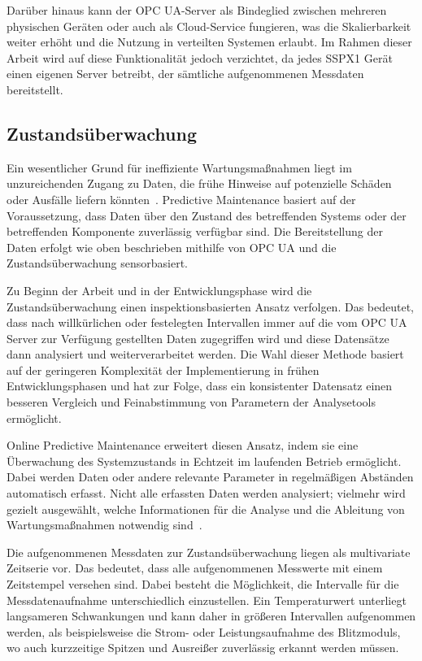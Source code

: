 Darüber hinaus kann der OPC UA-Server als Bindeglied zwischen mehreren physischen Geräten oder auch als Cloud-Service fungieren,
was die Skalierbarkeit weiter erhöht und die Nutzung in verteilten Systemen erlaubt. Im Rahmen dieser Arbeit wird auf diese Funktionalität
jedoch verzichtet, da jedes SSPX1 Gerät einen eigenen Server betreibt, der sämtliche aufgenommenen Messdaten bereitstellt.

\subsection{Zustandsüberwachung}\label{sec:zustandsueberwachung}
Ein wesentlicher Grund für ineffiziente Wartungsmaßnahmen liegt im unzureichenden Zugang zu Daten, die frühe Hinweise auf
potenzielle Schäden oder Ausfälle liefern könnten~\cite[S.~2]{Mobley2002}. Predictive Maintenance basiert auf der Voraussetzung, dass
Daten über den Zustand des betreffenden Systems oder der betreffenden Komponente zuverlässig verfügbar sind. Die Bereitstellung der
Daten erfolgt wie oben beschrieben mithilfe von OPC UA und die Zustandsüberwachung sensorbasiert.

Zu Beginn der Arbeit und in der Entwicklungsphase wird die Zustandsüberwachung einen inspektionsbasierten Ansatz verfolgen. Das
bedeutet, dass nach willkürlichen oder festelegten Intervallen immer auf die vom OPC UA Server zur Verfügung gestellten Daten
zugegriffen wird und diese Datensätze dann analysiert und weiterverarbeitet werden. Die Wahl dieser Methode basiert auf der
geringeren Komplexität der Implementierung in frühen Entwicklungsphasen und hat zur Folge, dass ein konsistenter Datensatz einen
besseren Vergleich und Feinabstimmung von Parametern der Analysetools ermöglicht.

Online Predictive Maintenance erweitert diesen Ansatz, indem sie eine Überwachung des Systemzustands in Echtzeit im laufenden Betrieb
ermöglicht. Dabei werden Daten oder andere relevante Parameter in regelmäßigen Abständen automatisch erfasst. Nicht alle erfassten
Daten werden analysiert; vielmehr wird gezielt ausgewählt, welche Informationen für die Analyse und die Ableitung von Wartungsmaßnahmen
notwendig sind~\cite{Lindstroem2017}. 

Die aufgenommenen Messdaten zur Zustandsüberwachung liegen als multivariate Zeitserie vor. Das bedeutet, dass alle aufgenommenen Messwerte
mit einem Zeitstempel versehen sind. Dabei besteht die Möglichkeit, die Intervalle für die Messdatenaufnahme unterschiedlich einzustellen.
Ein Temperaturwert unterliegt langsameren Schwankungen und kann daher in größeren Intervallen aufgenommen werden, als beispielsweise die
Strom- oder Leistungsaufnahme des Blitzmoduls, wo auch kurzzeitige Spitzen und Ausreißer zuverlässig erkannt werden müssen.

